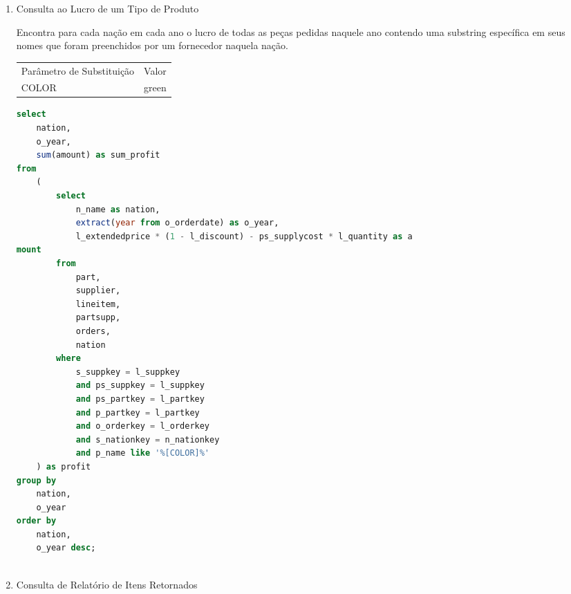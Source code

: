 \begin{enumerate}
	\begin{lstlisting}[language=SQL]
select
	o_year,
	sum(case
		when nation = '[NATION]' 
		then volume
		else 0
	end) / sum(volume) as mkt_share
from
	(
		select
			extract(year from o_orderdate) as o_year,
			l_extendedprice * (1 - l_discount) as volume,
			n2.n_name as nation
		from
			part,
			supplier,
			lineitem,
			orders,
			customer,
			nation n1,
			nation n2,
			region
		where
			p_partkey = l_partkey
			and s_suppkey = l_suppkey
			and l_orderkey = o_orderkey
			and o_custkey = c_custkey
			and c_nationkey = n1.n_nationkey
			and n1.n_regionkey = r_regionkey
			and r_name = '[REGION]'
			and s_nationkey = n2.n_nationkey
			and o_orderdate between date '1995-01-01' and date '1996-12-31'
						and p_type = '[TYPE]'
	) as all_nations
group by
	o_year
order by
	o_year;
	
	\end{lstlisting}

\item[Q9 --] Consulta ao Lucro de um Tipo de Produto

    Encontra para cada nação em cada ano o lucro de todas as peças pedidas naquele ano contendo uma substring específica em seus nomes que foram preenchidos por um fornecedor naquela nação.
    
\begin{tabular}{ll}
	Parâmetro de Substituição & Valor\\
	COLOR & green\\
\end{tabular}

	\begin{lstlisting}[language=SQL]
select
	nation,
	o_year,
	sum(amount) as sum_profit
from
	(
		select
			n_name as nation,
			extract(year from o_orderdate) as o_year,
			l_extendedprice * (1 - l_discount) - ps_supplycost * l_quantity as a
mount
		from
			part,
			supplier,
			lineitem,
			partsupp,
			orders,
			nation
		where
			s_suppkey = l_suppkey
			and ps_suppkey = l_suppkey
			and ps_partkey = l_partkey
			and p_partkey = l_partkey
			and o_orderkey = l_orderkey
			and s_nationkey = n_nationkey
			and p_name like '%[COLOR]%'
	) as profit
group by
	nation,
	o_year
order by
	nation,
	o_year desc;
	
	\end{lstlisting}

\item[Q10 --] Consulta de Relatório de Itens Retornados


\end{enumerate}
